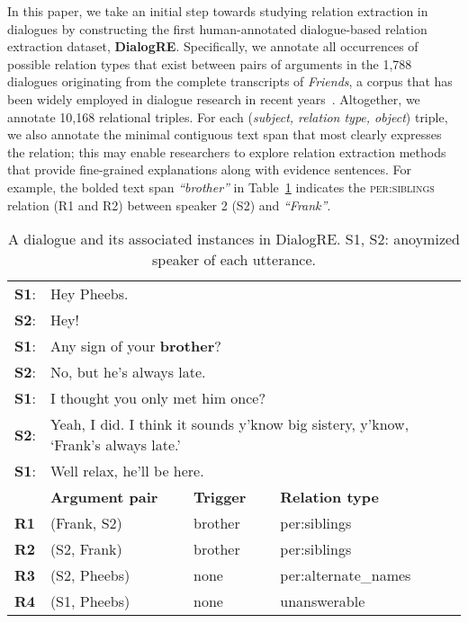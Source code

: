 \documentclass[11pt,a4paper]{article}
\begin{document}
In this paper, we take an initial step towards studying relation extraction in dialogues by constructing the first human-annotated dialogue-based relation extraction dataset, \textbf{DialogRE}. Specifically, we annotate all occurrences of  possible relation types that exist between pairs of arguments in the 1,788 dialogues originating from the complete transcripts of \textit{Friends}, a corpus that has been widely employed in dialogue research in recent years~\cite{catizone-etal-2010-using,chen2016character,chen2017robust,zhou2018they,rashid-blanco-2018-characterizing,yang2019friendsqa}.  Altogether, we annotate 10,168 relational triples.
For each (\emph{subject, relation type, object}) triple, we also annotate the minimal contiguous text span that most clearly expresses the relation; this may enable researchers to explore relation extraction methods that provide fine-grained explanations along with evidence sentences. For example, the bolded text span \emph{``brother''} in Table~\ref{tab:sample1} indicates the \textsc{per:siblings} relation (R1 and R2) between speaker 2 (S2) and \emph{``Frank''}.  


\begin{table}[t!]
\centering
\footnotesize
\begin{tabular}{p{0.2cm}lll}
\toprule
\textbf{S1}:    & \multicolumn{3}{p{6.5cm}}{Hey Pheebs.}                         \\
\textbf{S2}:    & \multicolumn{3}{p{6.5cm}}{Hey!}                         \\
\textbf{S1}:    & \multicolumn{3}{p{6.5cm}}{Any sign of your \textbf{brother}?}                         \\
\textbf{S2}:    & \multicolumn{3}{p{6.5cm}}{No, but he's always late.}                         \\
\textbf{S1}:    & \multicolumn{3}{p{6.5cm}}{I thought you only met him once?}                         \\
\textbf{S2}:    & \multicolumn{3}{p{6.5cm}}{Yeah, I did. I think it sounds y'know big sistery, y'know, `Frank's always late.'}                         \\
\textbf{S1}:    & \multicolumn{3}{p{6.5cm}}{Well relax, he'll be here.}                         \\
\midrule
               & \textbf{Argument pair}               & \textbf{Trigger}        &  \textbf{Relation type}   \\
\textbf{R1}    & (Frank, S2)          & brother       &  per:siblings               \\
\textbf{R2}    & (S2, Frank)          & brother       &  per:siblings               \\
\textbf{R3}    & (S2, Pheebs)         & none          &  per:alternate\_names               \\
\textbf{R4}    & (S1, Pheebs)         & none          &  unanswerable                 \\
\bottomrule
\end{tabular}
\caption{A dialogue and its associated instances in DialogRE. S1, S2: anoymized speaker of each utterance.}
\label{tab:sample1}
\end{table}
\end{document}
